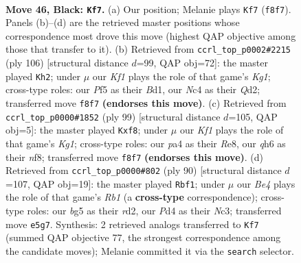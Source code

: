 \documentclass[11pt]{article}
\begin{document}
\clearpage

\begin{figure}[p]\centering
\begin{subfigure}{0.46\textwidth}\centering
\resizebox{\linewidth}{!}{%
\newchessgame
\chessboard[
  setfen={1q3k2/r6p/b3p2Q/p2pbpB1/P1np3P/8/2R2P2/RN2N1K1 b - - 13 46},
  showmover=false,
  pgfstyle=straightmove, color=movearrow, markmove={f8-f7}
]}
\caption{}
\end{subfigure}\hfill
\begin{subfigure}{0.46\textwidth}\centering
\resizebox{\linewidth}{!}{%
\newchessgame
\chessboard[
  setfen={6k1/p3r2p/Pp1B1bb1/1NpP1q2/2P5/1P4Rn/3Q4/3B2K1 w - - 0 54},
  showmover=false,
  pgfstyle=straightmove, color=movearrow, markmove={g1-h2}
]}
\caption{}
\end{subfigure}
\\[4pt]
\begin{subfigure}{0.46\textwidth}\centering
\resizebox{\linewidth}{!}{%
\newchessgame
\chessboard[
  setfen={4rNk1/8/p2p2p1/1p1Pbn1p/1P2R3/3Q1p1P/2R2P2/q4BK1 b - - 0 50},
  showmover=false,
  pgfstyle=straightmove, color=movearrow, markmove={g8-f8}
]}
\caption{}
\end{subfigure}\hfill
\begin{subfigure}{0.46\textwidth}\centering
\resizebox{\linewidth}{!}{%
\newchessgame
\chessboard[
  setfen={r6k/1b2bp2/7P/4pBp1/2PqP1Q1/1PN2R2/3r4/1R5K w - - 5 46},
  showmover=false,
  pgfstyle=straightmove, color=movearrow, markmove={b1-f1}
]}
\caption{}
\end{subfigure}
\caption{\textbf{Move 46, Black: \texttt{Kf7}.} (a) Our position; Melanie plays \texttt{Kf7} (\texttt{f8f7}). Panels (b)--(d) are the retrieved master positions whose correspondence most drove this move (highest QAP objective among those that transfer to it). (b) Retrieved from \texttt{ccrl\_top\_p0002\#2215} (ply 106) [structural distance $d$=99, QAP obj=72]: the master played \texttt{Kh2}; under $\mu$ our \emph{Kf1} plays the role of that game's \emph{Kg1}; cross-type roles: our \emph{P}f5 as their \emph{B}d1, our \emph{N}c4 as their \emph{Q}d2; transferred move \texttt{f8f7} \textbf{(endorses this move)}. (c) Retrieved from \texttt{ccrl\_top\_p0000\#1852} (ply 99) [structural distance $d$=105, QAP obj=5]: the master played \texttt{Kxf8}; under $\mu$ our \emph{Kf1} plays the role of that game's \emph{Kg1}; cross-type roles: our \emph{p}a4 as their \emph{R}e8, our \emph{q}h6 as their \emph{n}f8; transferred move \texttt{f8f7} \textbf{(endorses this move)}. (d) Retrieved from \texttt{ccrl\_top\_p0000\#802} (ply 90) [structural distance $d$=107, QAP obj=19]: the master played \texttt{Rbf1}; under $\mu$ our \emph{Be4} plays the role of that game's \emph{Rb1} (a \textbf{cross-type} correspondence); cross-type roles: our \emph{b}g5 as their \emph{r}d2, our \emph{P}d4 as their \emph{N}c3; transferred move \texttt{e5g7}. Synthesis: 2 retrieved analogs transferred to \texttt{Kf7} (summed QAP objective 77, the strongest correspondence among the candidate moves); Melanie committed it via the \texttt{search} selector.}
\label{fig:thought-m91}
\end{figure}
\end{document}
